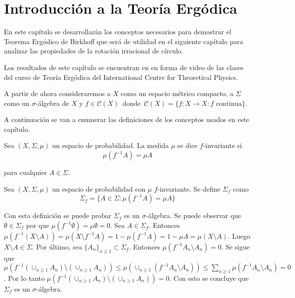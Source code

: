 \chapter{Introducción a la Teoría Ergódica}

En este capítulo se desarrollarán los conceptos necesarios para  demostrar el Teorema Ergódico de Birkhoff que será de utilidad en el siguiente capítulo para analizar las propiedades de la rotación irracional de círculo.

Los resultados de este capítulo se encuentran en \cite{youtube} en forma de video de las clases del curso de Teoría Ergódica del International Centre for Theoretical Physics.

A partir de ahora consideraremos a $X$ como un espacio métrico compacto, a $\Sigma$ como un $\sigma$-álgebra de $X$ y \mbox{$f \in \mathcal{C}(X)$ donde $\mathcal{C}(X) = \{f: X \rightarrow X: f \text{ continua}\}$}.

A continuación se van a enumerar las definiciones de los conceptos usados en este capítulo.

\begin{definicion}
	Sea $(X,\Sigma,\mu)$ un espacio de probabilidad. La medida $\mu$ se dice $f$-invariante si	
	\begin{equation}
		\mu(f^{-1}A) = \mu A
	\end{equation}
	
	para cualquier $A \in \Sigma$.
\end{definicion}

\begin{definicion}
	Sea $(X,\Sigma,\mu)$ un espacio de probabilidad  con $\mu$ $f$-invariante. Se define $\Sigma_f$ como	
	\begin{equation}
		\Sigma_f = \{ A \in \Sigma: \mu(f^{-1}A) = \mu A \}
	\end{equation}
\end{definicion}

Con esta definición se puede probar $\Sigma_f$ es un $\sigma$-álgebra. Se puede observar que $\emptyset \in \Sigma_f$ por que $\mu(f^{-1} \emptyset) = \mu \emptyset = 0$. Sea $A \in \Sigma_f$. Entonces $\mu(f^{-1}(X \setminus A)) =  \mu(X \setminus f^{-1}A) = 1 - \mu(f^{-1}A) = 1 - \mu A = \mu(X \setminus A)$. Luego $X \setminus A \in \Sigma$. Por último, sea $\{A_n\}_{n \geq 1} \subset \Sigma_f$. Entonces $\mu(f^{-1}A_n \setminus A_n) = 0$. Se sigue que $\mu(f^{-1}(\cup_{n \geq 1} A_n) \setminus (\cup_{n \geq 1} A_n)) \leq \mu(\cup_{n \geq 1} (f^{-1}A_n \setminus A_n)) \leq \sum_{n \geq 1} \mu(f^{-1}A_n \setminus A_n) = 0$. Por lo tanto $\mu(f^{-1}(\cup_{n \geq 1} A_n) \setminus (\cup_{n \geq 1} A_n)) = 0$. Con esto se concluye que $\Sigma_f$ es un $\sigma$-álgebra. 

